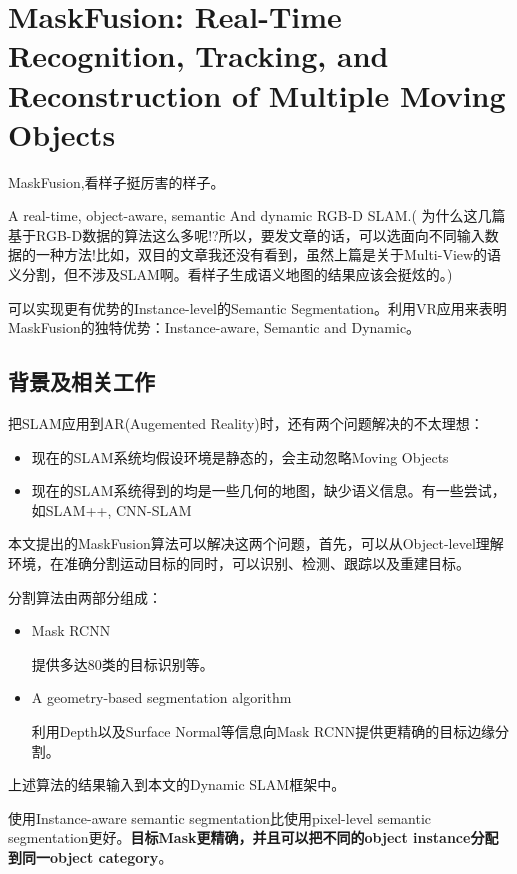 \section[MaskFusion]{MaskFusion: Real-Time Recognition, Tracking, and Reconstruction of Multiple Moving Objects}

MaskFusion,看样子挺厉害的样子。

A real-time, object-aware, semantic And dynamic RGB-D SLAM.({\color{red} 为什么这几篇基于RGB-D数据的算法这么多呢!?所以，要发文章的话，可以选面向不同输入数据的一种方法!比如，双目的文章我还没有看到，虽然上篇是关于Multi-View的语义分割，但不涉及SLAM啊。看样子生成语义地图的结果应该会挺炫的。})

可以实现更有优势的Instance-level的Semantic Segmentation。利用VR应用来表明MaskFusion的独特优势：Instance-aware, Semantic and Dynamic。

\subsection{背景及相关工作}

把SLAM应用到AR(Augemented Reality)时，还有两个问题解决的不太理想：
\begin{itemize}
\item 现在的SLAM系统均假设环境是静态的，会主动忽略Moving Objects
\item 现在的SLAM系统得到的均是一些几何的地图，缺少语义信息。有一些尝试，如SLAM++, CNN-SLAM
\end{itemize}

本文提出的MaskFusion算法可以解决这两个问题，首先，可以从Object-level理解环境，在准确分割运动目标的同时，可以识别、检测、跟踪以及重建目标。

分割算法由两部分组成：
\begin{itemize}
\item Mask RCNN

提供多达80类的目标识别等。

\item A geometry-based segmentation algorithm

利用Depth以及Surface Normal等信息向Mask RCNN提供更精确的目标边缘分割。

\end{itemize}

上述算法的结果输入到本文的Dynamic SLAM框架中。

使用Instance-aware semantic segmentation比使用pixel-level semantic segmentation更好。{\bfseries 目标Mask更精确，并且可以把不同的object instance分配到同一object category}。

